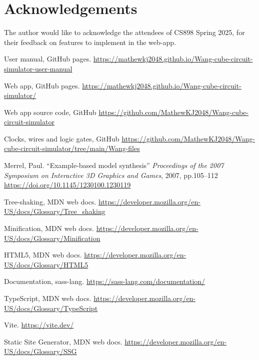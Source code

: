 \documentclass[letterpaper,11pt]{article}
\begin{document}
\section*{Acknowledgements}

The author would like to acknowledge the attendees of CS898 Spring 2025, for their feedback on features to implement in the web-app.

    
{\setlength{\baselineskip}{13pt} %
\raggedright				%
\begin{thebibliography}{99}




 User manual, GitHub pages. \url{https://mathewkj2048.github.io/Wang-cube-circuit-simulator-user-manual}

 Web app, GitHub pages. \url{https://mathewkj2048.github.io/Wang-cube-circuit-simulator/}

 Web app source code, GitHub \url{https://github.com/MathewKJ2048/Wang-cube-circuit-simulator}

 Clocks, wires and logic gates, GitHub \url{https://github.com/MathewKJ2048/Wang-cube-circuit-simulator/tree/main/Wang-files}

 Merrel, Paul. ``Example-based model synthesis'' \textit{Proceedings of the 2007 Symposium on Interactive 3D Graphics and Games}, 2007, pp.105--112 \url{https://doi.org/10.1145/1230100.1230119}

 Tree-shaking, MDN web docs. \url{https://developer.mozilla.org/en-US/docs/Glossary/Tree_shaking}

 Minification, MDN web docs. \url{https://developer.mozilla.org/en-US/docs/Glossary/Minification}

 HTML5,  MDN web docs. \url{https://developer.mozilla.org/en-US/docs/Glossary/HTML5}

 Documentation, sass-lang. \url{https://sass-lang.com/documentation/}

 TypeScript,  MDN web docs. \url{https://developer.mozilla.org/en-US/docs/Glossary/TypeScript}

 Vite. \url{https://vite.dev/}

 Static Site Generator, MDN web docs. \url{https://developer.mozilla.org/en-US/docs/Glossary/SSG}


\end{thebibliography}}
\end{document}
